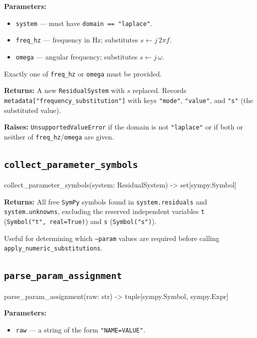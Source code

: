 \documentclass[11pt,a4paper]{article}
\newcommand{\code}[1]{\texttt{#1}}
\newcommand{\sympy}{\texttt{SymPy}}
\newenvironment{apisig}{%
  \begin{trivlist}\item\relax\ttfamily\small
}{%
  \end{trivlist}
}
\begin{document}
\textbf{Parameters:}
\begin{itemize}[noitemsep]
    \item \code{system} --- must have \code{domain == "laplace"}.
    \item \code{freq\_hz} --- frequency in Hz; substitutes
          \(s \leftarrow j\,2\pi f\).
    \item \code{omega} --- angular frequency; substitutes
          \(s \leftarrow j\,\omega\).
\end{itemize}

Exactly one of \code{freq\_hz} or \code{omega} must be provided.

\textbf{Returns:} A new \code{ResidualSystem} with \(s\) replaced.
Records \code{metadata["frequency\_substitution"]} with keys
\code{"mode"}, \code{"value"}, and \code{"s"} (the substituted value).

\textbf{Raises:} \code{UnsupportedValueError} if the domain is not
\code{"laplace"} or if both or neither of \code{freq\_hz}/\code{omega} are given.

\subsection{\texttt{collect\_parameter\_symbols}}
\label{api:collect_parameter_symbols}

\begin{apisig}
collect\_parameter\_symbols(system: ResidualSystem) -> set[sympy.Symbol]
\end{apisig}

\textbf{Returns:} All free \sympy{} symbols found in \code{system.residuals} and
\code{system.unknowns}, excluding the reserved independent variables
\code{t} (\code{Symbol("t",~real=True)}) and \code{s} (\code{Symbol("s")}).

Useful for determining which \code{--param} values are required before
calling \code{apply\_numeric\_substitutions}.

\subsection{\texttt{parse\_param\_assignment}}
\label{api:parse_param_assignment}

\begin{apisig}
parse\_param\_assignment(raw: str) -> tuple[sympy.Symbol, sympy.Expr]
\end{apisig}

\textbf{Parameters:}
\begin{itemize}[noitemsep]
    \item \code{raw} --- a string of the form \code{"NAME=VALUE"}.
\end{itemize}
\end{document}
